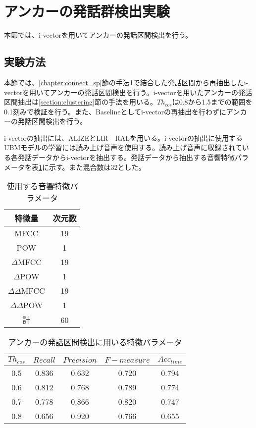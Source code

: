 \section{アンカーの発話群検出実験}
本節では、i-vectorを用いてアンカーの発話区間検出を行う。
\label{chapter:get_anchor}
\subsection{実験方法}
本節では、\ref{chapter:connect_sp}節の手法1で結合した発話区間から再抽出したi-vectorを用いてアンカーの発話区間検出を行う。i-vectorを用いたアンカーの発話区間抽出は\ref{section:clustering}節の手法を用いる。$Th_{cos}$は0.8から1.5までの範囲を0.1刻みで検証を行う。また、Baselineとしてi-vectorの再抽出を行わずにアンカーの発話区間検出を行う。\par
i-vectorの抽出には、ALIZEとLIR　RALを用いる。i-vectorの抽出に使用するUBMモデルの学習には読み上げ音声\cite{ATR}を使用する。読み上げ音声に収録されている各発話データからi-vectorを抽出する。発話データから抽出する音響特徴パラメータを表\ref{iv_feature2}に示す。また混合数は32とした。

\begin{table}[H]
  \begin{center}
    \caption{使用する音響特徴パラメータ \label{iv_feature2}}
    \begin{tabular}{|c||c|} \hline
      特徴量 & 次元数\\ \hline
      MFCC & 19  \\ 
      POW & 1  \\ 
      $\Delta$MFCC & 19 \\ 
      $\Delta$POW & 1 \\ 
      $\Delta\Delta$MFCC & 19 \\ 
      $\Delta\Delta$POW & 1 \\ \hline
      計 & 60 \\ \hline
    \end{tabular}
  \end{center}
\end{table}

\begin{table}[H]
  \begin{center}
    \caption{アンカーの発話区間検出に用いる特徴パラメータ \label{table:detail_feature_get_anchor}}
    \begin{tabular}{|c||c|c|c|c|} \hline
      $Th_{cos}$ & $Recall$ & $Precision$ & $F-measure$ & $Acc_{time}$\\ \hline
0.5 & 0.836 & 0.632 & 0.720 & 0.794 \\ \hline
0.6 & 0.812 & 0.768 & 0.789 & 0.774 \\ \hline
0.7 & 0.778 & 0.866 & 0.820 & 0.747 \\ \hline
0.8 & 0.656 & 0.920 & 0.766 & 0.655 \\ \hline

    \end{tabular}
  \end{center}
\end{table}

